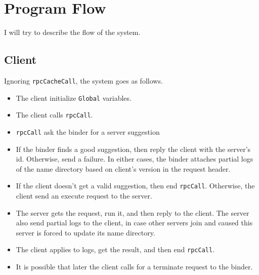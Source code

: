 \section{Program Flow}
I will try to describe the flow of the system.

\subsection{Client}
Ignoring {\tt rpcCacheCall}, the system goes as follows.
\begin{itemize}
\item
The client initialize {\tt Global} variables.
\item
The client calls {\tt rpcCall}.
\item
{\tt rpcCall} ask the binder for a server suggestion
\item
If the binder finds a good suggestion, then reply the client with the server's id.
Otherwise, send a failure.
In either cases, the binder attaches partial logs of the name directory based on client's version in the request header.
\item
If the client doesn't get a valid suggestion, then end {\tt rpcCall}.
Otherwise, the client send an execute request to the server.
\item
The server gets the request, run it, and then reply to the client.
The server also send partial logs to the client, in case other servers join and caused this server is forced to update its name directory.
\item
The client applies to logs, get the result, and then end {\tt rpcCall}.
\item
It is possible that later the client calls for a terminate request to the binder.
\end{itemize}

